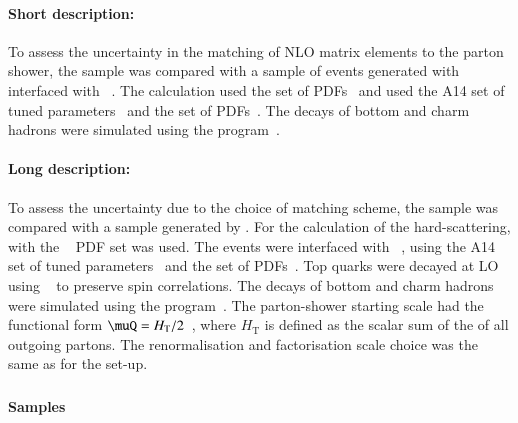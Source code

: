 \paragraph{Short description:}

To assess the uncertainty in the matching of NLO matrix elements to the
parton shower, the \POWHEG sample was compared with a sample of events
generated with \MGNLO[2.6.0] interfaced with
\PYTHIA[8.230]~\cite{Sjostrand:2014zea}. The \MGNLO calculation used the
\NNPDF[3.0nlo] set of PDFs~\cite{Ball:2014uwa} and \PYTHIA[8] used
the A14 set of tuned parameters~\cite{ATL-PHYS-PUB-2014-021} and
the \NNPDF[2.3lo] set of PDFs~\cite{Ball:2012cx}.
The decays of bottom and charm hadrons
were simulated using the \EVTGEN[1.6.0] program~\cite{Lange:2001uf}. 

\paragraph{Long description:}

To assess the uncertainty due to the choice of matching scheme,
the \POWHEG sample was compared with a sample generated by 
\MGNLOPY[8]. For the calculation of the hard-scattering,
\MGNLO[2.6.0] with the \NNPDF[3.0nlo]~\cite{Ball:2014uwa} PDF set was
used. The events were interfaced with
\PYTHIA[8.230]~\cite{Sjostrand:2014zea}, using the A14 set of tuned
parameters~\cite{ATL-PHYS-PUB-2014-021} and the \NNPDF[2.3lo] set of PDFs~\cite{Ball:2012cx}.
Top quarks were decayed at LO using
\MADSPIN~\cite{Frixione:2007zp,Artoisenet:2012st} to preserve spin
correlations. The decays of bottom and charm hadrons were simulated
using the \EVTGEN[1.6.0] program~\cite{Lange:2001uf}.  The parton-shower starting
scale had the functional form $\muQ = H_{\mathrm T}/2$~\cite{ATL-PHYS-PUB-2017-007}, 
where $H_{\mathrm T}$ is defined as the scalar sum of the \pT of all outgoing partons.  
The renormalisation and factorisation scale choice was the same as for the
\POWHEGBOX set-up.

\subsubsection[MadGraph5\_aMC@NLO+Herwig7.13]{\MGNLOHER[7.13]}

\paragraph{Samples}

